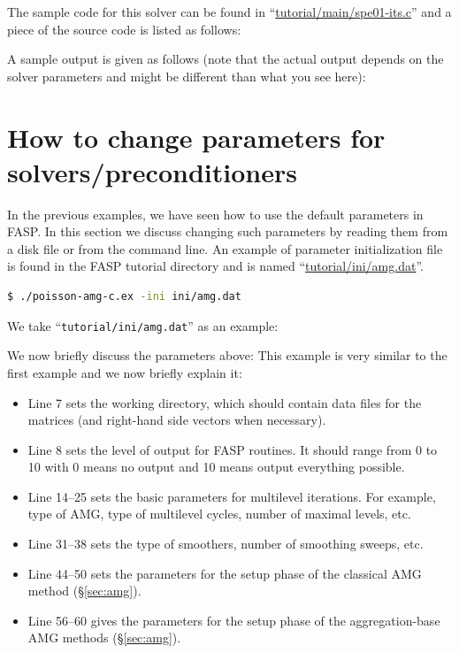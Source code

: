 \documentclass[11pt]{memoir}
\begin{document}
The sample code for this solver can be found in ``\url{tutorial/main/spe01-its.c}'' and a piece of the source code is listed as follows:
%

%
A sample output is given as follows (note that the actual output depends on the solver parameters and might be different than what you see here):


\section{How to change parameters for
  solvers/preconditioners}\label{sec:parameters}

In the previous examples, we have seen how to use the default parameters in FASP. In this section we discuss changing such parameters
by reading them from a disk file or from the command line. An example of parameter initialization file is found in the FASP
tutorial directory and is named ``\url{tutorial/ini/amg.dat}''.
%
\begin{lstlisting}[numbers=none,language=sh]
$ ./poisson-amg-c.ex -ini ini/amg.dat
\end{lstlisting}
%
We take ``\verb|tutorial/ini/amg.dat|'' as an example:


We now briefly discuss the parameters above:
%
This example is very similar to the first example and we now briefly explain it:
\begin{itemize}
%
\item Line 7 sets the working directory, which should contain data files for the matrices (and right-hand side vectors when necessary).
%
\item Line 8 sets the level of output for FASP routines. It should range from 0 to 10 with 0 means no output and 10 means output everything possible.
%
\item Line 14--25 sets the basic parameters for multilevel iterations. For example, type of AMG, type of multilevel cycles, number of maximal levels, etc.
%
\item Line 31--38 sets the type of smoothers, number of smoothing sweeps, etc.
%
\item Line 44--50 sets the parameters for the setup phase of the classical AMG method (\S\ref{sec:amg}).
%
\item Line 56--60 gives the parameters for the setup phase of the aggregation-base AMG methods (\S\ref{sec:amg}).
%
\end{itemize}
%
\end{document}
